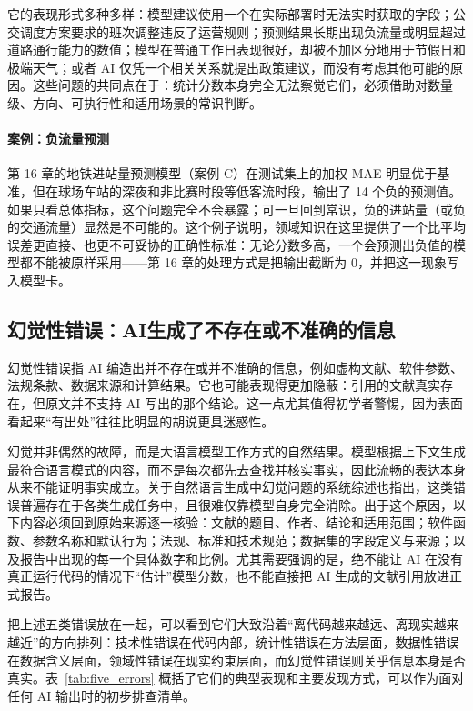 它的表现形式多种多样：模型建议使用一个在实际部署时无法实时获取的字段；公交调度方案要求的班次调整违反了运营规则；预测结果长期出现负流量或明显超过道路通行能力的数值；模型在普通工作日表现很好，却被不加区分地用于节假日和极端天气；或者 AI 仅凭一个相关关系就提出政策建议，而没有考虑其他可能的原因。这些问题的共同点在于：统计分数本身完全无法察觉它们，必须借助对数量级、方向、可执行性和适用场景的常识判断。

\paragraph{案例：负流量预测}

第 16 章的地铁进站量预测模型（案例 C）在测试集上的加权 MAE 明显优于基准，但在球场车站的深夜和非比赛时段等低客流时段，输出了 14 个负的预测值。如果只看总体指标，这个问题完全不会暴露；可一旦回到常识，负的进站量（或负的交通流量）显然是不可能的。这个例子说明，领域知识在这里提供了一个比平均误差更直接、也更不可妥协的正确性标准：无论分数多高，一个会预测出负值的模型都不能被原样采用——第 16 章的处理方式是把输出截断为 0，并把这一现象写入模型卡。

\subsection{幻觉性错误：AI生成了不存在或不准确的信息}

幻觉性错误指 AI 编造出并不存在或并不准确的信息，例如虚构文献、软件参数、法规条款、数据来源和计算结果。它也可能表现得更加隐蔽：引用的文献真实存在，但原文并不支持 AI 写出的那个结论。这一点尤其值得初学者警惕，因为表面看起来“有出处”往往比明显的胡说更具迷惑性。

幻觉并非偶然的故障，而是大语言模型工作方式的自然结果。模型根据上下文生成最符合语言模式的内容，而不是每次都先去查找并核实事实，因此流畅的表达本身从来不能证明事实成立\cite{bender2021stochastic}。关于自然语言生成中幻觉问题的系统综述也指出，这类错误普遍存在于各类生成任务中，且很难仅靠模型自身完全消除\cite{ji2023survey}。出于这个原因，以下内容必须回到原始来源逐一核验：文献的题目、作者、结论和适用范围；软件函数、参数名称和默认行为；法规、标准和技术规范；数据集的字段定义与来源；以及报告中出现的每一个具体数字和比例。尤其需要强调的是，绝不能让 AI 在没有真正运行代码的情况下“估计”模型分数，也不能直接把 AI 生成的文献引用放进正式报告。

把上述五类错误放在一起，可以看到它们大致沿着“离代码越来越远、离现实越来越近”的方向排列：技术性错误在代码内部，统计性错误在方法层面，数据性错误在数据含义层面，领域性错误在现实约束层面，而幻觉性错误则关乎信息本身是否真实。表~\ref{tab:five_errors} 概括了它们的典型表现和主要发现方式，可以作为面对任何 AI 输出时的初步排查清单。

